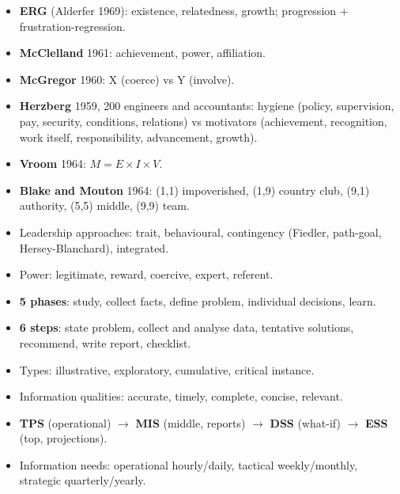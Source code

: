 {\begin{itemize}
  \item \textbf{ERG} (Alderfer 1969): existence, relatedness, growth; progression +
    frustration-regression.
  \item \textbf{McClelland} 1961: achievement, power, affiliation.
  \item \textbf{McGregor} 1960: X (coerce) vs Y (involve).
  \item \textbf{Herzberg} 1959, 200 engineers and accountants: hygiene (policy, supervision,
    pay, security, conditions, relations) vs motivators (achievement, recognition, work
    itself, responsibility, advancement, growth).
  \item \textbf{Vroom} 1964: $M = E \times I \times V$.
  \item \textbf{Blake and Mouton} 1964: (1,1) impoverished, (1,9) country club, (9,1)
    authority, (5,5) middle, (9,9) team.
  \item Leadership approaches: trait, behavioural, contingency (Fiedler, path-goal,
    Hersey-Blanchard), integrated.
  \item Power: legitimate, reward, coercive, expert, referent.
\end{itemize}
\begin{itemize}
  \item \textbf{5 phases}: study, collect facts, define problem, individual decisions, learn.
  \item \textbf{6 steps}: state problem, collect and analyse data, tentative solutions,
    recommend, write report, checklist.
  \item Types: illustrative, exploratory, cumulative, critical instance.
\end{itemize}
\begin{itemize}
  \item Information qualities: accurate, timely, complete, concise, relevant.
  \item \textbf{TPS} (operational) $\rightarrow$ \textbf{MIS} (middle, reports)
    $\rightarrow$ \textbf{DSS} (what-if) $\rightarrow$ \textbf{ESS} (top, projections).
  \item Information needs: operational hourly/daily, tactical weekly/monthly, strategic
    quarterly/yearly.
\end{itemize}}

\par{}\vspace{4pt}


